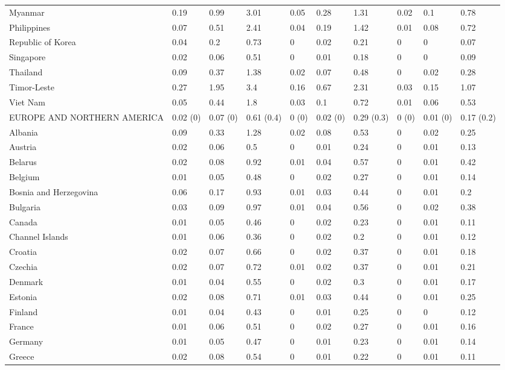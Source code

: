 \begin{longtable}[t]{llllllllll}
Myanmar & 0.19 & 0.99 & 3.01 & 0.05 & 0.28 & 1.31 & 0.02 & 0.1 & 0.78\\
Philippines & 0.07 & 0.51 & 2.41 & 0.04 & 0.19 & 1.42 & 0.01 & 0.08 & 0.72\\
Republic of Korea & 0.04 & 0.2 & 0.73 & 0 & 0.02 & 0.21 & 0 & 0 & 0.07\\
Singapore & 0.02 & 0.06 & 0.51 & 0 & 0.01 & 0.18 & 0 & 0 & 0.09\\
Thailand & 0.09 & 0.37 & 1.38 & 0.02 & 0.07 & 0.48 & 0 & 0.02 & 0.28\\
Timor-Leste & 0.27 & 1.95 & 3.4 & 0.16 & 0.67 & 2.31 & 0.03 & 0.15 & 1.07\\
Viet Nam & 0.05 & 0.44 & 1.8 & 0.03 & 0.1 & 0.72 & 0.01 & 0.06 & 0.53\\
EUROPE AND NORTHERN AMERICA & 0.02 (0) & 0.07 (0) & 0.61 (0.4) & 0 (0) & 0.02 (0) & 0.29 (0.3) & 0 (0) & 0.01 (0) & 0.17 (0.2)\\
Albania & 0.09 & 0.33 & 1.28 & 0.02 & 0.08 & 0.53 & 0 & 0.02 & 0.25\\
Austria & 0.02 & 0.06 & 0.5 & 0 & 0.01 & 0.24 & 0 & 0.01 & 0.13\\
Belarus & 0.02 & 0.08 & 0.92 & 0.01 & 0.04 & 0.57 & 0 & 0.01 & 0.42\\
Belgium & 0.01 & 0.05 & 0.48 & 0 & 0.02 & 0.27 & 0 & 0.01 & 0.14\\
Bosnia and Herzegovina & 0.06 & 0.17 & 0.93 & 0.01 & 0.03 & 0.44 & 0 & 0.01 & 0.2\\
Bulgaria & 0.03 & 0.09 & 0.97 & 0.01 & 0.04 & 0.56 & 0 & 0.02 & 0.38\\
Canada & 0.01 & 0.05 & 0.46 & 0 & 0.02 & 0.23 & 0 & 0.01 & 0.11\\
Channel Islands & 0.01 & 0.06 & 0.36 & 0 & 0.02 & 0.2 & 0 & 0.01 & 0.12\\
Croatia & 0.02 & 0.07 & 0.66 & 0 & 0.02 & 0.37 & 0 & 0.01 & 0.18\\
Czechia & 0.02 & 0.07 & 0.72 & 0.01 & 0.02 & 0.37 & 0 & 0.01 & 0.21\\
Denmark & 0.01 & 0.04 & 0.55 & 0 & 0.02 & 0.3 & 0 & 0.01 & 0.17\\
Estonia & 0.02 & 0.08 & 0.71 & 0.01 & 0.03 & 0.44 & 0 & 0.01 & 0.25\\
Finland & 0.01 & 0.04 & 0.43 & 0 & 0.01 & 0.25 & 0 & 0 & 0.12\\
France & 0.01 & 0.06 & 0.51 & 0 & 0.02 & 0.27 & 0 & 0.01 & 0.16\\
Germany & 0.01 & 0.05 & 0.47 & 0 & 0.01 & 0.23 & 0 & 0.01 & 0.14\\
Greece & 0.02 & 0.08 & 0.54 & 0 & 0.01 & 0.22 & 0 & 0.01 & 0.11\\

\end{longtable}
